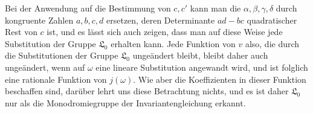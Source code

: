 \documentclass[11pt]{article}
\begin{document}
Bei der Anwendung auf die Bestimmung von $c,c'$ kann man die $\alpha,\beta,\gamma,\delta$ durch kongruente Zahlen $a,b,c,d$ ersetzen, deren Determinante $ad-bc$ quadratischer Rest von $c$ ist, und es lässt sich auch zeigen, dass man auf diese Weise jede Substitution der Gruppe $\mathfrak L_0$ erhalten kann. Jede Funktion von $v$ also, die durch die Substitutionen der Gruppe $\mathfrak L_0$ ungeändert bleibt, bleibt daher auch ungeändert, wenn auf $\omega$ eine lineare Substitution angewandt wird, und ist folglich eine rationale Funktion von $j(\omega)$. Wie aber die Koeffizienten in dieser Funktion beschaffen sind, darüber lehrt uns diese Betrachtung nichts, und es ist daher $\mathfrak L_0$ nur als die Monodromiegruppe der Invariantengleichung erkannt.
\end{document}
